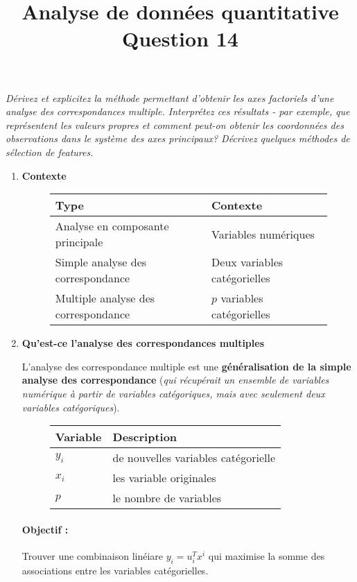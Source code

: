 \documentclass[a4paper, 11pt, onecolumn]{article}
\title{Analyse de données quantitative\\Question 14}
\date{}
\begin{document}
\maketitle

\textit{Dérivez et explicitez la méthode permettant d'obtenir les axes factoriels d'une analyse des correspondances multiple. Interprétez ces résultats - par exemple, que représentent les valeurs propres et comment peut-on obtenir les coordonnées des observations dans le système des axes principaux? Décrivez quelques méthodes de sélection de features.}

\begin{enumerate}

\item \textbf{Contexte}

\begin{figure}[H]
\centering
\begin{tabular}{ll}
\textbf{Type} & \textbf{Contexte} \\
\hline
Analyse en composante principale & Variables numériques\\
Simple analyse des correspondance& Deux variables catégorielles\\
Multiple analyse des correspondance & $p$ variables catégorielles
\end{tabular}
\end{figure}

\item \textbf{Qu'est-ce l'analyse des correspondances multiples}

  L'analyse des correspondance multiple est une \textbf{généralisation de la simple analyse des correspondance} (\textit{qui récupérait un ensemble de variables numérique à partir de variables catégoriques, mais avec seulement deux variables catégoriques}).

\begin{figure}[H]
\centering
\begin{tabular}{ll}
\textbf{Variable} & \textbf{Description} \\
\hline
$y_i$ & de nouvelles variables catégorielle\\
$x_i$ & les variable originales\\
$p$ & le nombre de variables
\end{tabular}
\end{figure}

\paragraph{Objectif :} Trouver une combinaison linéiare $y_i = u_i^Tx^i$ qui maximise la somme des associations entre les variables catégorielles. 


\end{enumerate}
\end{document}
